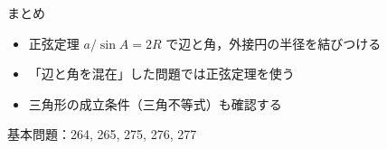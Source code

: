 \documentclass[aspectratio=43,professionalfonts,handout]{beamer}
\begin{document}
\begin{frame}{まとめ}
  \begin{itemize}
    \item 正弦定理 $a/\sin A = 2R$ で辺と角，外接円の半径を結びつける
    \item 「辺と角を混在」した問題では正弦定理を使う
    \item 三角形の成立条件（三角不等式）も確認する
  \end{itemize}

  \vfill
  {\small 基本問題：264, 265, 275, 276, 277}
\end{frame}
\end{document}
